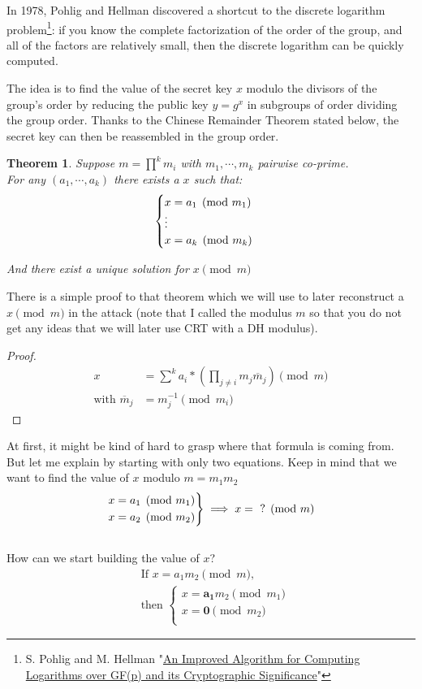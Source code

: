 \documentclass[a4paper,11pt,twocolumn]{article}
\newenvironment{rcases}
  {\left.\begin{aligned}}
  {\end{aligned}\right\rbrace}
\newtheorem{theorem}{Theorem}
\begin{document}
In 1978, Pohlig and Hellman discovered a shortcut to the discrete logarithm problem\footnote{S. Pohlig and M. Hellman "\href{http://www-ee.stanford.edu/~hellman/publications/28.pdf}{An Improved Algorithm for Computing Logarithms over GF(p) and its Cryptographic Significance}"}\cite{PH}: if you know the complete factorization of the order of the group, and all of the factors are relatively small, then the discrete logarithm can be quickly computed.

The idea is to find the value of the secret key $x$ modulo the divisors of the group's order by reducing the public key $y = g^x$ in subgroups of order dividing the group order. Thanks to the Chinese Remainder Theorem stated below, the secret key can then be reassembled in the group order.

\begin{theorem}
Suppose $m = \prod\limits^{k} m_i$ with $m_1, \cdots, m_k$ pairwise co-prime.\\

For any $(a_1, \cdots, a_k)$ there exists a $x$ such that:\\

$$
\begin{cases}
x= a_1 \pmod{m_1}\\
\vdots\\
x= a_k \pmod{m_k}\\
\end{cases}\\
$$

And there exist a unique solution for $x \pmod{m}$
\end{theorem}

There is a simple proof to that theorem which we will use to later reconstruct a $x \pmod{m}$ in the attack (note that I called the modulus $m$ so that you do not get any ideas that we will later use CRT with a DH modulus).
\begin{proof}
  \begin{align*}
      x &= \sum^{k} a_i * (\prod_{j \neq i} m_{j} \overline{m}_{j}) \pmod{m} \\
      \mbox{with }\overline{m}_{j} &= m_{j}^{-1} \pmod{m_i}
  \end{align*}
\end{proof}
At first, it might be kind of hard to grasp where that formula is coming from. But let me explain by starting with only two equations. Keep in mind that we want to find the value of $x$ modulo $m = m_1 m_2$
\[
\begin{rcases}
x = a_1 \pmod{m_1}\\
x = a_2 \pmod{m_2}
\end{rcases}
\implies x = \text{ ?} \pmod{m}
\]\\
How can we start building the value of $x$?
\begin{align*}
&\text{If } x = a_1  m_2\pmod{m} \text{,}\\
&\text{then }
\begin{cases}
x = \boldsymbol{a_1} m_2 \pmod{m_1}\\
x = \boldsymbol{0} \pmod{m_2}\\
\end{cases}
\end{align*}
\end{document}
